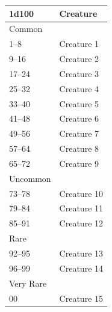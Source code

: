 \begin{multicols}{2}
\noindent
\begin{minipage}{\columnwidth}

\label{examplepercentile}
\noindent
\begin{tabular}{|p{}|p{}|}
\hline
1d100		& Creature \\
\hline\hline
\rowcolor[gray]{.9}Common		& \\
\rowcolor[gray]{.9}\hspace{2em}1--8	& Creature 1 \\
\hspace{2em}9--16	& Creature 2 \\
\rowcolor[gray]{.9}\hspace{2em}17--24	& Creature 3 \\
\hspace{2em}25--32	& Creature 4 \\
\rowcolor[gray]{.9}\hspace{2em}33--40	& Creature 5 \\
\hspace{2em}41--48	& Creature 6 \\
\rowcolor[gray]{.9}\hspace{2em}49--56	& Creature 7 \\
\hspace{2em}57--64	& Creature 8 \\
\rowcolor[gray]{.9}\hspace{2em}65--72	& Creature 9 \\
Uncommon	& \\
\hspace{2em}73--78	& Creature 10 \\
\rowcolor[gray]{.9}\hspace{2em}79--84	& Creature 11 \\
\hspace{2em}85--91	& Creature 12 \\
\rowcolor[gray]{.9}Rare		& \\
\rowcolor[gray]{.9}\hspace{2em}92--95	& Creature 13 \\
\hspace{2em}96--99	& Creature 14 \\
\rowcolor[gray]{.9}Very Rare	& \\
\rowcolor[gray]{.9}\hspace{2em}00		& Creature 15 \\
\hline
\end{tabular}


\end{minipage}
\end{multicols}
